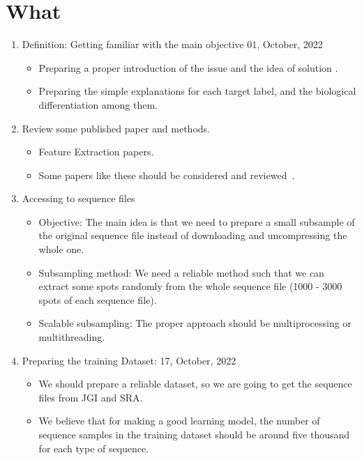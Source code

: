 \documentclass[a4paper]{article}
\newcommand{\deadline}[1]{{\color{blue} \hfill{#1} }}
\begin{document}
    \section{What}\label{sec:what}
    \begin{enumerate}
        \item Definition: Getting familiar with the main objective \deadline{01, October, 2022}
        \begin{itemize}
            \item Preparing a proper introduction of the issue and the idea of solution .
            \item Preparing the simple explanations for each target label, and the biological differentiation among them.
        \end{itemize}
        \item Review some published paper and methods.
        \begin{itemize}
            \item Feature Extraction papers.
            \item Some papers like these should be considered and reviewed~\cite[]{RF102}.
        \end{itemize}
        \item Accessing to sequence files
        \begin{itemize}
            \item Objective: The main idea is that we need to prepare a small subsample of the original sequence file instead of downloading and uncompressing the whole one.
            \item Subsampling method: We need a reliable method such that we can extract some spots randomly from the whole sequence file (1000 - 3000 spots of each sequence file).
            \item Scalable subsampling: The proper approach should be multiprocessing or multithreading.
        \end{itemize}
        \item Preparing the training Dataset:\deadline{17, October, 2022}
        \begin{itemize}
            \item We should prepare a reliable dataset, so we are going to get the sequence files from JGI and SRA.\@
            \item We believe that for making a good learning model, the number of sequence samples in the training dataset should be around five thousand for each type of sequence.
        \end{itemize}

\end{enumerate}
\end{document}
